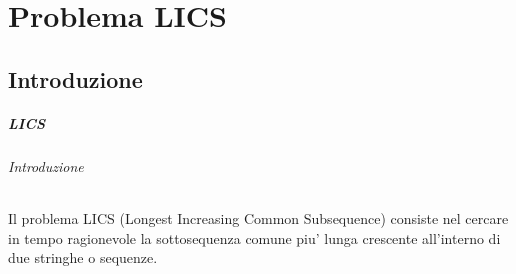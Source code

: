 \chapter{Problema LICS}

\section{Introduzione}

\paragraph{LICS}

\subparagraph{Introduzione}

Il problema LICS (Longest Increasing Common Subsequence) consiste nel cercare in tempo ragionevole la sottosequenza comune piu' lunga crescente all'interno di due stringhe o sequenze.

